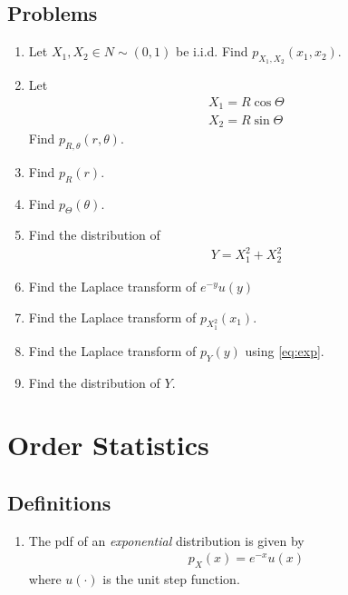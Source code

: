 \documentclass[journal,12pt,onecolumn]{IEEEtran}
\renewcommand\thesection{\arabic{section}}
\renewcommand\thesubsection{\thesection.\arabic{subsection}}
\providecommand{\brak}[1]{\ensuremath{\left(#1\right)}}
\theoremstyle{remark}
\numberwithin{equation}{section}
\begin{document}
\subsection{Problems}
\begin{enumerate}[label=\arabic*.,ref=\thesubsection.\theenumi]
\item Let $X_1,X_2 \in N\sim (0,1)$ be i.i.d.
	Find $p_{X_1,X_2}\brak{x_1,x_2}$.
\item Let
\begin{align}
X_1 = R\cos \Theta  \\
X_2 = R\sin \Theta 
\end{align}
		Find $p_{R, \theta} \brak{r, \theta}$. 
	\item Find $ p_R(r)$.
	\item Find $p_{\Theta}(\theta)$.
\item Find the distribution of 
\begin{align}
Y = X_1^2+X_2^2
	\label{eq:exp}
\end{align} 
\item Find the Laplace transform of $e^{-y}u(y)$
\item Find the Laplace transform of $p_{X_1^2}(x_1)$.
\item Find the Laplace transform of $p_Y(y)$ using 
	\eqref{eq:exp}.
\item Find the distribution of $Y$.
\end{enumerate}

\section{Order Statistics}
\subsection{Definitions}
\begin{enumerate}[label=\arabic*.,ref=\thesubsection.\theenumi]
\item The pdf of an {\em exponential} distribution is given by 
\begin{align}
	p_X(x) = e^{-x}u(x) 
\end{align}
		where $u\brak{\cdot}$ is the unit step function.
\end{enumerate}
\end{document}
